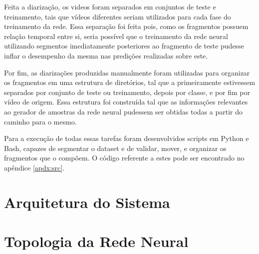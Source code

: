 Feita a diarização, os videos foram separados em conjuntos de teste e treinamento, tais que vídeos diferentes seriam utilizados para cada fase do treinamento da rede. Essa separação foi feita pois, como os fragmentos possuem relação temporal entre si, seria possível que o treinamento da rede neural utilizando segmentos imediatamente posteriores ao fragmento de teste pudesse inflar o desempenho da mesma nas predições realizadas sobre este.

Por fim, as diarizações produzidas manualmente foram utilizadas para organizar os fragmentos em uma estrutura de diretórios, tal que a primeiramente estivessem separados por conjunto de teste ou treinamento, depois por classe, e por fim por vídeo de origem. Essa estrutura foi construída tal que as informações relevantes ao gerador de amostras da rede neural pudessem ser obtidas todas a partir do caminho para o mesmo.

Para a execução de todas essas tarefas foram desenvolvidos scripts em Python e Bash, capazes de segmentar o dataset e de validar, mover, e organizar os fragmentos que o compõem. O código referente a estes pode ser encontrado no apêndice \ref{apdx:src}.

\section{Arquitetura do Sistema}
\label{sec:sysarch}


\section{Topologia da Rede Neural}
\label{sec:topology}

